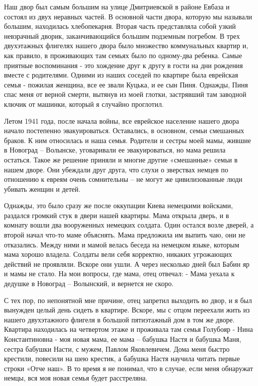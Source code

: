 Наш двор был самым большим на улице Дмитриевской в районе Евбаза и состоял из
двух неравных частей. В основной части двора, которую мы называли большим,
находилась хлебопекарня. Вторая часть представляла собой узкий невзрачный
дворик, заканчивающийся большим подземным погребом. В трех двухэтажных флигелях
нашего двора было множество коммунальных квартир и, как правило, в проживающих
там семьях было по одному-два ребенка. Самые приятные воспоминания - это
хождение друг к другу в гости на дни рождения вместе с родителями. Одними из
наших соседей по квартире была еврейская семья - пожилая женщина, все ее звали
Куцька, и ее сын Пиня. Однажды, Пиня спас меня от верной смерти, вытянув из
моей глотки, застрявший там заводной ключик от машинки, который я случайно
проглотил.

Летом 1941 года, после начала войны, все еврейское население нашего двора
начало постепенно эвакуироваться. Оставались, в основном, семьи смешанных
браков. К ним относилась и наша семья. Родители и сестры моей мамы, жившие в
Новоград – Волынске, уговаривали ее эвакуироваться, но мама решила остаться.
Такое же решение приняли и многие другие «смешанные» семьи в нашем дворе. Они
убеждали друг друга, что слухи о зверствах немцев по отношению к евреям очень
сомнительны – не могут же цивилизованные люди убивать женщин и детей.

Однажды, это было сразу же после оккупации Киева немецкими войсками, раздался
громкий стук в двери нашей квартиры. Мама открыла дверь, и в комнату вошли два
вооруженных немецких солдата. Один остался возле дверей, а второй начал что-то
маме объяснять. Мама предложила им выпить чаю, они не отказались. Между ними и
мамой велась беседа на немецком языке, которым мама хорошо владела. Солдаты
вели себя корректно, никаких угрожающих действий не проявляли. Вскоре они ушли.
А через несколько дней был Бабин яр и мамы не стало. На мои вопросы, где мама,
отец отвечал: - Мама уехала к дедушке в Новоград – Волынский, и вернется не
скоро.

С тех пор, по непонятной мне причине, отец запретил выходить во двор, и я был
вынужден целый день сидеть в квартире. Вскоре, мы с отцом переехали жить из
нашего двухэтажного флигеля в большой пятиэтажный дом в том же дворе. Квартира
находилась на четвертом этаже и проживала там семья Голубояр - Нина
Константиновна - моя новая мама, ее мама – бабушка Настя и бабушка Маня, сестра
бабушки Насти, с мужем, Павлом Яковлевичем. Дома меня быстро крестили, повесили
на шею крестик, а бабушка Настя научила читать первые строки «Отче наш». В то
время я не понимал, что в случае, если меня обнаружат немцы, вся моя новая
семья будет расстреляна.

